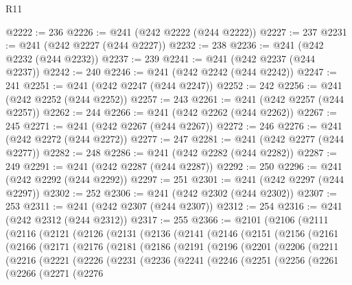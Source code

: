 \begin{lexlean}{R11}
\begin{coremodule}
@2222 := 236
@2226 := @241 (@242 @2222 (@244 @2222))
@2227 := 237
@2231 := @241 (@242 @2227 (@244 @2227))
@2232 := 238
@2236 := @241 (@242 @2232 (@244 @2232))
@2237 := 239
@2241 := @241 (@242 @2237 (@244 @2237))
@2242 := 240
@2246 := @241 (@242 @2242 (@244 @2242))
@2247 := 241
@2251 := @241 (@242 @2247 (@244 @2247))
@2252 := 242
@2256 := @241 (@242 @2252 (@244 @2252))
@2257 := 243
@2261 := @241 (@242 @2257 (@244 @2257))
@2262 := 244
@2266 := @241 (@242 @2262 (@244 @2262))
@2267 := 245
@2271 := @241 (@242 @2267 (@244 @2267))
@2272 := 246
@2276 := @241 (@242 @2272 (@244 @2272))
@2277 := 247
@2281 := @241 (@242 @2277 (@244 @2277))
@2282 := 248
@2286 := @241 (@242 @2282 (@244 @2282))
@2287 := 249
@2291 := @241 (@242 @2287 (@244 @2287))
@2292 := 250
@2296 := @241 (@242 @2292 (@244 @2292))
@2297 := 251
@2301 := @241 (@242 @2297 (@244 @2297))
@2302 := 252
@2306 := @241 (@242 @2302 (@244 @2302))
@2307 := 253
@2311 := @241 (@242 @2307 (@244 @2307))
@2312 := 254
@2316 := @241 (@242 @2312 (@244 @2312))
@2317 := 255
@2366 := @2101
    (@2106
      (@2111
        (@2116
          (@2121
            (@2126
              (@2131
                (@2136
                  (@2141
                    (@2146
                      (@2151
                        (@2156
                          (@2161
                            (@2166
                              (@2171
                                (@2176
                                  (@2181
                                    (@2186
                                      (@2191
                                        (@2196
                                          (@2201
                                            (@2206
                                              (@2211
                                                (@2216
                                                  (@2221
                                                    (@2226
                                                      (@2231
                                                        (@2236
                                                          (@2241
                                                            (@2246
                                                              (@2251
                                                                (@2256
                                                                  (@2261
                                                                    (@2266
                                                                      (@2271
                                                                        (@2276

\end{coremodule}
\end{lexlean}
